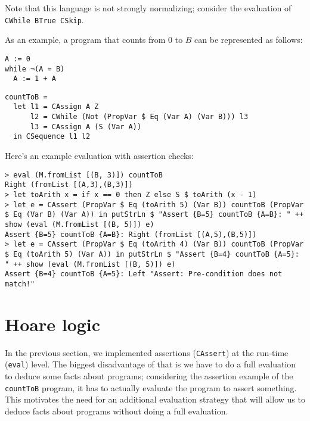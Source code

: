 \documentclass{article}
\begin{document}
Note that this language is not strongly normalizing; consider the evaluation of \texttt{CWhile BTrue CSkip}.

As an example, a program that counts from 0 to $B$ can be represented as follows:

\begin{minipage}{0.29\textwidth}
\begin{lstlisting}
A := 0
while ¬(A = B)
  A := 1 + A
\end{lstlisting}
\end{minipage}
\begin{minipage}{0.69\textwidth}
\begin{lstlisting}
countToB =
  let l1 = CAssign A Z
      l2 = CWhile (Not (PropVar $ Eq (Var A) (Var B))) l3
      l3 = CAssign A (S (Var A))
  in CSequence l1 l2
\end{lstlisting}
\end{minipage}

\pagebreak

Here's an example evaluation with assertion checks:

\begin{lstlisting}
> eval (M.fromList [(B, 3)]) countToB
Right (fromList [(A,3),(B,3)])
> let toArith x = if x == 0 then Z else S $ toArith (x - 1)
> let e = CAssert (PropVar $ Eq (toArith 5) (Var B)) countToB (PropVar $ Eq (Var B) (Var A)) in putStrLn $ "Assert {B=5} countToB {A=B}: " ++ show (eval (M.fromList [(B, 5)]) e)
Assert {B=5} countToB {A=B}: Right (fromList [(A,5),(B,5)])
> let e = CAssert (PropVar $ Eq (toArith 4) (Var B)) countToB (PropVar $ Eq (toArith 5) (Var A)) in putStrLn $ "Assert {B=4} countToB {A=5}: " ++ show (eval (M.fromList [(B, 5)]) e)
Assert {B=4} countToB {A=5}: Left "Assert: Pre-condition does not match!"
\end{lstlisting}

\section{Hoare logic}

In the previous section, we implemented assertions (\texttt{CAssert}) at the run-time (\texttt{eval}) level. The biggest disadvantage of that is we have to do a full evaluation to deduce some facts about programs; considering the assertion example of the \texttt{countToB} program, it has to actually evaluate the program to assert something. This motivates the need for an additional evaluation strategy that will allow us to deduce facts about programs without doing a full evaluation.
\end{document}
